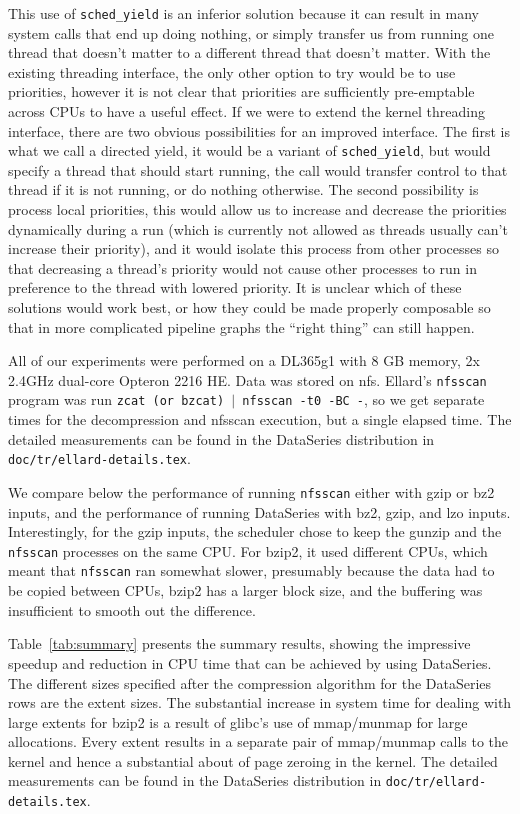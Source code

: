 This use of \texttt{sched\_yield} is an inferior solution because it
can result in many system calls that end up doing nothing, or simply
transfer us from running one thread that doesn't matter to a different
thread that doesn't matter.  With the existing threading interface,
the only other option to try would be to use priorities, however it is
not clear that priorities are sufficiently pre-emptable across CPUs to
have a useful effect.  If we were to extend the kernel threading
interface, there are two obvious possibilities for an improved
interface.  The first is what we call a directed yield, it would be a
variant of \texttt{sched\_yield}, but would specify a thread that should start
running, the call would transfer control to that thread if it is not
running, or do nothing otherwise.  The second possibility is process
local priorities, this would allow us to increase and decrease the
priorities dynamically during a run (which is currently not allowed as
threads usually can't increase their priority), and it would isolate
this process from other processes so that decreasing a thread's
priority would not cause other processes to run in preference to the
thread with lowered priority.  It is unclear which of these solutions
would work best, or how they could be made properly composable so that
in more complicated pipeline graphs the ``right thing'' can still
happen.

All of our experiments were performed on a DL365g1 with 8 GB memory,
2x 2.4GHz dual-core Opteron 2216 HE.  Data was stored on nfs.
Ellard's \texttt{nfsscan} program was run \texttt{zcat (or bzcat) $|$
nfsscan -t0 -BC -}, so we get separate times for the decompression and
nfsscan execution, but a single elapsed time.  The detailed
measurements can be found in the DataSeries distribution in
\texttt{doc/tr/ellard-details.tex}.



We compare below the performance of running \texttt{nfsscan} either
with gzip or bz2 inputs, and the performance of running DataSeries
with bz2, gzip, and lzo inputs.  Interestingly, for the gzip inputs,
the scheduler chose to keep the gunzip and the \texttt{nfsscan}
processes on the same CPU.  For bzip2, it used different CPUs, which
meant that \texttt{nfsscan} ran somewhat slower, presumably because
the data had to be copied between CPUs, bzip2 has a larger block size,
and the buffering was insufficient to smooth out the difference.

Table~\ref{tab:summary} presents the summary results, showing the
impressive speedup and reduction in CPU time that can be achieved by
using DataSeries.  The different sizes specified after the compression
algorithm for the DataSeries rows are the extent sizes. 
The substantial increase in system time for dealing
with large extents for bzip2 is a result of glibc's use of mmap/munmap
for large allocations.  Every extent results in a separate pair of
mmap/munmap calls to the kernel and hence a substantial about of page
zeroing in the kernel.  The detailed measurements can be found 
in the DataSeries distribution in \texttt{doc/tr/ellard-details.tex}.

